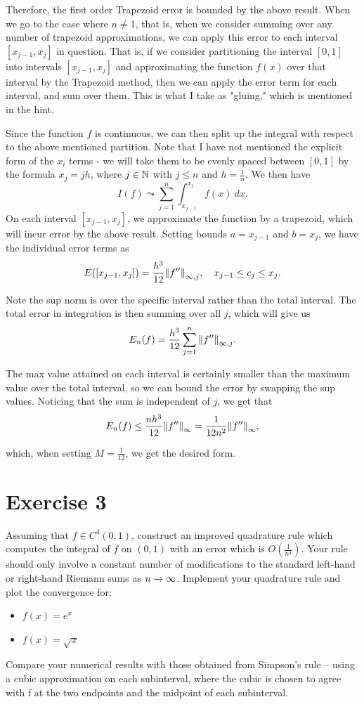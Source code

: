 \begin{solution}
    Therefore, the first order Trapezoid error is bounded by the above result. When we go to the case where $n \neq 1$, that is, when we consider summing over any number of trapezoid approximations, we can apply this error to each interval $[x_{j-1}, x_j]$ in question. That is, if we consider partitioning the interval $[0, 1]$ into intervals $[x_{j-1}, x_j]$ and approximating the function $f(x)$ over that interval by the Trapezoid method, then we can apply the error term for each interval, and sum over them. This is what I take as "gluing," which is mentioned in the hint. \par

    \jump
    Since the function $f$ is continuous, we can then split up the integral with respect to the above mentioned partition. Note that I have not mentioned the explicit form of the $x_i$ terms - we will take them to be evenly spaced between $[0, 1]$ by the formula $x_j = jh$, where $j \in \mathbb{N}$ with $j \leq n$ and $h = \frac{1}{n}$. We then have 
    \[I(f) \leadsto \sum_{j = 1}^n \int_{x_{j-1}}^{x_j} f(x) \ dx.\]
    On each interval $[x_{j-1}, x_j]$, we approximate the function by a trapezoid, which will incur error by the above result. Setting bounds $a = x_{j-1}$ and $b = x_j$, we have the individual error terms as 
    \[E([x_{j-1}, x_j]) = \frac{h^3}{12}\norm{f''}_{\infty, j}, \quad x_{j-1} \leq c_j \leq x_j.\]

    Note the sup norm is over the specific interval rather than the total interval. The total error in integration is then summing over all $j$, which will give us 
    \[E_n(f) = \frac{h^3}{12}\sum_{j = 1}^n \norm{f''}_{\infty, j}.\]

    The max value attained on each interval is certainly smaller than the maximum value over the total interval, so we can bound the error by swapping the sup values. Noticing that the sum is independent of $j$, we get that 
    \[E_n(f) \leq \frac{nh^3}{12}\norm{f''}_{\infty} = \frac{1}{12n^2}\norm{f''}_{\infty},\]

    which, when setting $M = \frac{1}{12}$, we get the desired form. 
    
\end{solution}

\newpage
\section{Exercise 3}
Assuming that $f \in C^4(0, 1)$, construct an improved quadrature rule which computes the integral of $f$ on $(0, 1)$ with an error which is $O(\frac{1}{n^4})$. Your rule should only involve a constant number of modifications to the standard left-hand or right-hand Riemann sums as $n \rightarrow \infty$. Implement your quadrature rule and plot the convergence for:
\begin{itemize}
    \item $f(x) = e^x$
    \item $f(x) = \sqrt{x}$
\end{itemize}
Compare your numerical results with those obtained from Simpson’s rule – using a cubic approximation on each subinterval, where the cubic is chosen to agree with f at the two endpoints and the midpoint of each subinterval.

